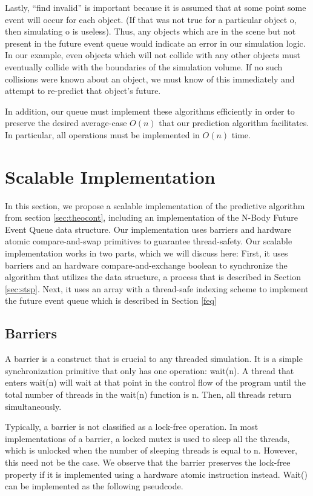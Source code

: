 \documentclass[CEJCS,PDF]{cej} %
\begin{document}
Lastly, ``find invalid'' is important because it is assumed that at some point some event will occur for each object. (If that was not true for a particular object o, then simulating o is 
useless).  Thus, any objects which are in the scene but not present in the future event queue would indicate an error in our simulation logic.  In our example, even objects which
will not collide with any other objects must eventually collide with the boundaries of the simulation volume.  If no such collisions were known about
an object, we must know of this immediately and attempt to re-predict that object's future.

In addition, our queue must implement these algorithms efficiently in order to preserve the desired average-case $O(n)$ that our prediction algorithm facilitates.  In particular, all operations must be implemented in $O(n)$ time.

\section{Scalable Implementation}
In this section, we propose a scalable implementation of the predictive algorithm from section \ref{sec:theocont}, including an implementation of the 
N-Body Future Event Queue data structure.  Our implementation uses barriers and hardware atomic compare-and-swap primitives to guarantee thread-safety.  Our scalable implementation
works in two parts, which we will discuss here:  First, it uses barriers and an hardware compare-and-exchange boolean to synchronize the algorithm that utilizes the data structure, 
a process that is described in Section \ref{sec:stsp}.  Next, it uses an array with a thread-safe indexing scheme to implement the future event queue which is described in Section \ref{feq}
\subsection{Barriers}
\label{sec:barrier}
A barrier is a construct that is crucial to any threaded simulation.  It is a simple synchronization primitive that only has one operation: wait(n).  
A thread that enters wait(n) will wait at that point in the control flow of the program until the total number of threads in the wait(n) function is n.  Then,
all threads return simultaneously.

Typically, a barrier is not classified as a lock-free operation.  In most implementations of a barrier, a locked mutex is used to sleep all the threads, which is 
unlocked when the number of sleeping threads is equal to n.  However, this need not be the case.  We observe that the barrier preserves the lock-free property if it is implemented
using a hardware atomic instruction instead.  Wait() can be implemented as the following pseudcode.
\end{document}

